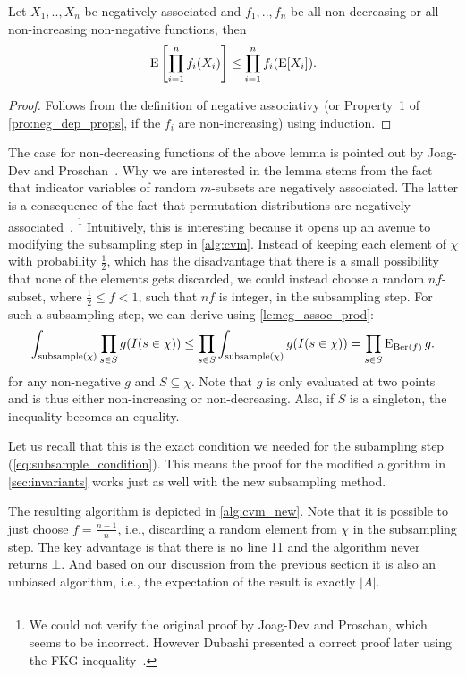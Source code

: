 \begin{lemma}\label{le:neg_assoc_prod}
Let $X_1,..,X_n$ be negatively associated and $f_1,..,f_n$ be all non-decreasing or all non-increasing non-negative functions, then
\[
  \operatorname{\mathrm{E}} \left[\prod_{i=1}^{n} f_i(X_i)\right] \leq \prod_{i=1}^{n} f_i(\operatorname{\mathrm{E}} [X_i]) \textrm{.}
\]
\end{lemma}
\begin{proof}
Follows from the definition of negative associativy (or Property~1 of \cref{pro:neg_dep_props}, if the $f_i$ are non-increasing) using induction.
\end{proof}

The case for non-decreasing functions of the above lemma is pointed out by Joag-Dev and Proschan~\cite[P.2]{joagdev1983}.
Why we are interested in the lemma stems from the fact that indicator variables of random $m$-subsets are negatively associated.
The latter is a consequence of the fact that permutation distributions are negatively-associated~\cite[Th. 2.11]{joagdev1983}.%
\footnote{We could not verify the original proof by Joag-Dev and Proschan, which seems to be incorrect.
However Dubashi presented a correct proof later using the FKG inequality~\cite[Th. 10]{dubhashi1996}.}
Intuitively, this is interesting because it opens up an avenue to modifying the subsampling step in \cref{alg:cvm}.
Instead of keeping each element of $\chi$ with probability $\frac{1}{2}$, which has the disadvantage that there is a small possibility that none of the elements gets discarded, we could instead choose a random $nf$-subset, where $\frac{1}{2} \leq f < 1$, such that $nf$ is integer, in the subsampling step.
For such a subsampling step, we can derive using \cref{le:neg_assoc_prod}:
\begin{equation}\label{eq:subsample_with_n_subsets}
  \int_{\mathrm{subsample}(\chi)} \prod_{s \in S} g(I(s \in \chi)) \leq \prod_{s \in S} \int_{\mathrm{subsample}(\chi)} g(I(s \in \chi)) = \prod_{s \in S}  \operatorname{\mathrm{E}}_{\operatorname{\mathrm{Ber}}(f)} g \textrm{.}
\end{equation}
for any non-negative $g$ and $S \subseteq \chi$. Note that $g$ is only evaluated at two points and is thus either non-increasing or non-decreasing.
Also, if $S$ is a singleton, the inequality becomes an equality.

Let us recall that this is the exact condition we needed for the subampling step (\cref{eq:subsample_condition}).
This means the proof for the modified algorithm in \cref{sec:invariants} works just as well with the new subsampling method.

The resulting algorithm is depicted in \cref{alg:cvm_new}.
Note that it is possible to just choose $f = \frac{n-1}{n}$, i.e., discarding a random element from $\chi$ in the subsampling step.
The key advantage is that there is no line 11 and the algorithm never returns $\bot$.
And based on our discussion from the previous section it is also an unbiased algorithm, i.e., the expectation of the result is exactly $|A|$.

